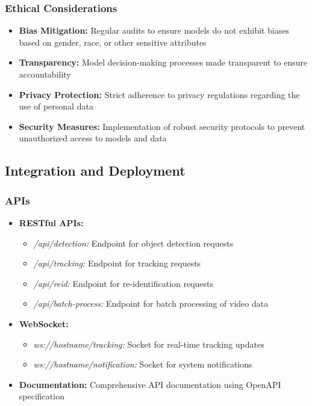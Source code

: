 \subsubsection{Ethical Considerations}
\label{subsubsection:ethical-considerations}

\begin{itemize}
    \item \textbf{Bias Mitigation:} Regular audits to ensure models do not exhibit biases based on gender, race, or other sensitive attributes
    \item \textbf{Transparency:} Model decision-making processes made transparent to ensure accountability
    \item \textbf{Privacy Protection:} Strict adherence to privacy regulations regarding the use of personal data
    \item \textbf{Security Measures:} Implementation of robust security protocols to prevent unauthorized access to models and data
\end{itemize}

\subsection{Integration and Deployment}
\label{subsection:integration-deployment}

\subsubsection{APIs}
\label{subsubsection:apis}

\begin{itemize}
    \item \textbf{RESTful APIs:} 
    \begin{itemize}
        \item \textit{/api/detection:} Endpoint for object detection requests
        \item \textit{/api/tracking:} Endpoint for tracking requests
        \item \textit{/api/reid:} Endpoint for re-identification requests
        \item \textit{/api/batch-process:} Endpoint for batch processing of video data
    \end{itemize}
    \item \textbf{WebSocket:} 
    \begin{itemize}
        \item \textit{ws://hostname/tracking:} Socket for real-time tracking updates
        \item \textit{ws://hostname/notification:} Socket for system notifications
    \end{itemize}
    \item \textbf{Documentation:} Comprehensive API documentation using OpenAPI specification
\end{itemize}

